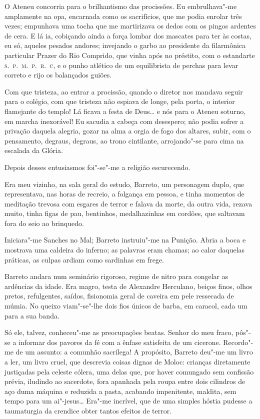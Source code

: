 O Ateneu concorria para o
brilhantismo das procissões. Eu embrulhava"-me amplamente na opa,
encarnada como os sacrifícios, que me podia enrolar três vezes;
empunhava uma tocha que me martirizava os dedos com os pingos ardentes
de cera. E lá ia, cobiçando ainda a força lombar dos mascates para ter
às costas, eu só, aqueles pesados andores; invejando o garbo ao
presidente da filarmônica particular Prazer do Rio Comprido, que vinha
após no préstito, com o estandarte \textsc{s.~p.~m.~p.~r.~c}, e o punho atlético de
um equilibrista de perchas para levar correto e rijo os balançados
guiões. 

Com que tristeza, ao entrar a procissão, quando o diretor nos
mandava seguir para o colégio, com que tristeza não espiava de longe,
pela porta, o interior flamejante do templo! Lá ficava a festa de
Deus\ldots{} e nós para o Ateneu soturno, em marcha inexorável! Eu sacudia a
cabeça com desespero; não podia sofrer a privação daquela alegria,
gozar na alma a orgia de fogo dos altares, subir, com o pensamento,
degraus, degraus, ao trono cintilante, arrojando"-se para cima na
escalada da Glória. 

Depois desses entusiasmos foi"-se"-me a religião escurecendo.

Era meu vizinho, na sala geral do estudo, Barreto, um personagem duplo,
que representava, nas horas de recreio, a folgança em pessoa, e tinha
momentos de meditação trevosa com esgares de terror e falava da morte,
da outra vida, rezava muito, tinha figas de pau, bentinhos,
medalhazinhas em cordões, que saltavam fora do seio ao brinquedo.

Iniciara"-me Sanches no Mal; Barreto instruiu"-me na Punição. Abria a
boca e mostrava uma caldeira do inferno; as palavras eram chamas; ao
calor daquelas práticas, as culpas ardiam como sardinhas em frege.

Barreto andara num seminário rigoroso, regime de nitro para congelar as
ardências da idade. Era magro, testa de Alexandre Herculano, beiços
finos, olhos pretos, refulgentes, saídos, fisionomia geral de caveira
em pele ressecada de múmia. No queixo viam"-se"-lhe dois fios únicos
de barba, em caracol, cada um para a sua banda. 

Só ele, talvez,
conheceu"-me as preocupações beatas. Senhor do meu fraco, pôs"-se a
informar dos pavores da fé com a ênfase satisfeita de um cicerone.
Recordo"-me de um assunto: a comunhão sacrílega! A propósito, Barreto
deu"-me um livro a ler, um livro cruel, que descrevia coisas dignas de
Moloc: crianças diretamente justiçadas pela celeste cólera, uma delas
que, por haver comungado sem confissão prévia, iludindo ao sacerdote,
fora apanhada pela roupa entre dois cilindros de aço duma máquina e
reduzida a pasta, acabando impenitente, maldita, sem tempo para um
ai"-jesus\ldots{} Era"-me incrível, que de uma simples hóstia pudesse a
taumaturgia da crendice obter tantos efeitos de terror. 

